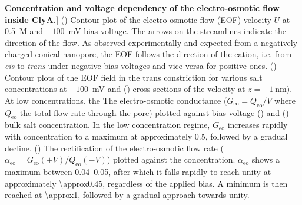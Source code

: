 \begin{figure*}[htbp]
\caption
[\textbf{Concentration and voltage dependency of the electro-osmotic flow inside ClyA.}]
{
() Contour plot of the electro-osmotic flow (EOF) velocity $U$ at 0.5~M 
and $-100$~mV bias voltage. The arrows on the streamlines indicate the direction of the flow. As observed 
experimentally\cite{soskine2013} and expected from a negatively charged conical nanopore, the EOF follows the 
direction of the cation, i.e. from \textit{cis} to \textit{trans} under negative bias voltages and vice versa 
for positive ones.
()
Contour plots of the EOF field in the trans constriction for various salt concentrations at $-100$~mV and
()
cross-sections of the velocity at $z=\SI{-1}{\nano\meter})$. At low concentrations, the 
The electro-osmotic conductance ($G_\text{eo} = Q_\text{eo}/V$ where $Q_\text{eo}$ the total flow rate through
the pore) plotted against bias voltage () and 
() bulk salt concentration. In the low concentration regime, 
$G_\text{eo}$ increases rapidly with concentration to a maximum at approximately \SI{0.5}{\Molar}, followed 
by a gradual decline.
()
The rectification of the electro-osmotic flow rate ($\alpha_\text{eo} = G_\text{eo}(+V)/Q_\text{eo}(-V)$) 
plotted against the concentration.
$\alpha_\text{eo}$ shows a maximum between \SIrange{0.04}{0.05}{\Molar}, after which it falls rapidly to 
reach unity at approximately \SI{\approx0.45}{\Molar}, regardless of the applied bias.
A minimum is then reached at \SI{\approx1}{\Molar}, followed by a gradual approach towards unity.
}

\label{fig:electro-osmotic_flow}

\end{figure*}